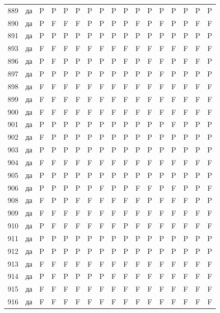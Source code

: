 \begin{table}[p]
\begin{tabular*}{\textwidth}{@{\extracolsep{\fill}}rcccccccccccccccc}
889 & да & P & P & P & P & P & P & P & P & P & P & P & P & P & P & P\\
890 & да & P & F & F & F & P & P & P & P & F & P & F & P & P & F & F\\
891 & да & P & P & P & P & P & P & P & P & P & P & P & P & P & P & P\\
893 & да & F & F & F & F & F & F & F & F & F & F & F & F & F & F & F\\
896 & да & P & F & P & P & P & P & P & F & P & F & F & P & F & F & P\\
897 & да & P & P & P & P & P & P & P & P & P & P & F & P & P & P & P\\
898 & да & F & F & F & F & F & F & F & F & F & F & F & F & F & F & F\\
899 & да & F & F & F & F & F & F & F & F & F & F & F & F & F & F & F\\
900 & да & F & F & F & F & F & F & F & F & F & F & F & F & F & F & F\\
901 & да & P & P & P & P & P & P & P & P & P & P & P & F & P & P & P\\
902 & да & F & P & P & P & P & P & P & P & P & P & P & P & P & P & P\\
903 & да & P & P & P & P & P & P & P & P & P & P & P & P & P & P & P\\
904 & да & F & F & F & F & F & F & F & F & F & F & F & F & F & F & F\\
905 & да & P & P & P & P & P & P & P & P & P & P & P & P & P & P & P\\
906 & да & P & P & P & P & P & F & P & P & F & F & P & F & P & P & F\\
908 & да & F & P & P & F & F & F & F & F & F & P & F & F & F & P & P\\
909 & да & F & F & F & F & F & F & F & F & F & F & F & F & F & F & F\\
910 & да & P & F & F & F & F & F & F & P & F & F & F & F & F & F & F\\
911 & да & P & P & P & P & P & P & P & P & P & P & P & P & P & P & P\\
912 & да & P & P & P & P & P & P & P & P & P & P & P & P & P & P & P\\
913 & да & F & F & F & F & F & F & F & F & F & F & F & F & F & F & F\\
914 & да & P & F & P & P & P & P & F & F & F & F & F & F & F & F & F\\
915 & да & F & F & F & F & F & F & F & F & F & F & F & F & F & F & F\\
916 & да & F & F & F & F & F & F & F & F & F & F & F & F & F & F & F\\
\bottomrule\end{tabular*}\end{table}
\clearpage


